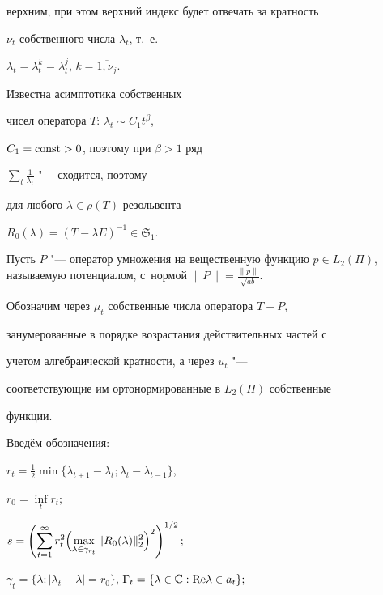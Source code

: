 верхним,  при этом верхний индекс будет отвечать за кратность

$\nu_t$ собственного числа $\lambda_t$,  т.\, е.

$\lambda_t=\lambda_t^k=\lambda_t^j$,  $k=\overline{1, \nu_j}$.

Известна \cite[стр.\, 206]{Titchmarsh} асимптотика собственных

чисел оператора $T$: $\lambda_t\sim C_1 t^{\beta}$, 

$C_1=\rm const>0$,  поэтому при $\displaystyle \beta > 1$ ряд

$ \sum_t\frac1{\lambda_{t}}$ "--- сходится,  поэтому

для любого $\lambda\in\rho(T)$ резольвента

$R_0(\lambda)=(T-\lambda E)^{-1}\in \mathfrak{S}_1$.



Пусть $P$ "--- оператор умножения на вещественную функцию $p\in

L_{2}(\Pi)$,  называемую потенциалом,  с~нормой $\|P\|=\frac{\|p\|}{\sqrt{ab}}$.





Обозначим через $\mu_{t}$ собственные числа оператора $T+P$, 

занумерованные в порядке возрастания действительных частей с

учетом алгебраической кратности,  а через $u_{t}$ "---

соответствующие им ортонормированные в $L_{2}(\Pi)$ собственные

функции.



 Введём обозначения:

 $

r_t=\frac12\min\{\lambda_{t+1}-\lambda_t;\lambda_t-\lambda_{t-1}\} $, 

$\displaystyle r_0=\inf\limits_t r_t;$



 $\displaystyle

s=\left(\sum_{t=1}^{\infty}r_{t}^{2}\Bigl(\max_{\lambda\in\gamma_{r_{t}}}

\|R_{0}(\lambda)\|_{2}^{2}\Bigr)^{2}\right)^{1/2};$



 $\gamma_t=\{\lambda:|\lambda_t-\lambda|=r_0\}$,  $\Gamma_{t}=\{\lambda\in \mathbb{C}: {\rm Re} \lambda\in a_{t}\};$



